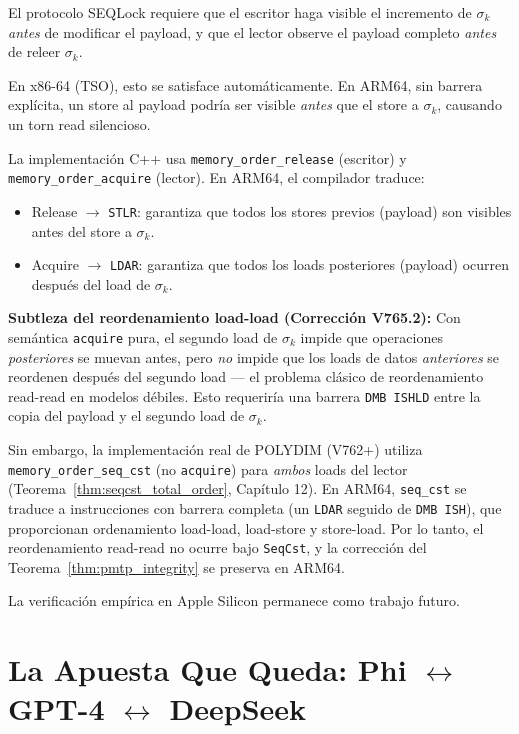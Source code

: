 \begin{remark}
\label{rem:arm_seqlock}
El protocolo SEQLock requiere que el escritor haga visible el incremento
de $\sigma_k$ \emph{antes} de modificar el payload, y que el lector
observe el payload completo \emph{antes} de releer $\sigma_k$.

En x86-64 (TSO), esto se satisface automáticamente. En ARM64, sin barrera
explícita, un store al payload podría ser visible \emph{antes} que el store
a $\sigma_k$, causando un torn read silencioso.

La implementación C++ usa \texttt{memory\_order\_release} (escritor) y
\texttt{memory\_order\_acquire} (lector). En ARM64, el compilador traduce:
\begin{itemize}
    \item Release $\to$ \texttt{STLR}: garantiza que todos los stores 
    previos (payload) son visibles antes del store a $\sigma_k$.
    \item Acquire $\to$ \texttt{LDAR}: garantiza que todos los loads 
    posteriores (payload) ocurren después del load de $\sigma_k$.
\end{itemize}

\textbf{Subtleza del reordenamiento load-load (Corrección V765.2):}
Con semántica \texttt{acquire} pura, el segundo load de $\sigma_k$ 
impide que operaciones \emph{posteriores} se muevan antes, pero 
\emph{no} impide que los loads de datos \emph{anteriores} se 
reordenen después del segundo load --- el problema clásico de 
reordenamiento read-read en modelos débiles. Esto requeriría una
barrera \texttt{DMB ISHLD} entre la copia del payload y el 
segundo load de $\sigma_k$.

Sin embargo, la implementación real de POLYDIM (V762+) utiliza
\texttt{memory\_order\_seq\_cst} (no \texttt{acquire}) para 
\emph{ambos} loads del lector 
(Teorema~\ref{thm:seqcst_total_order}, Capítulo 12). En ARM64,
\texttt{seq\_cst} se traduce a instrucciones con barrera completa 
(un \texttt{LDAR} seguido de \texttt{DMB ISH}), que proporcionan 
ordenamiento load-load, load-store y store-load. Por lo tanto, el 
reordenamiento read-read no ocurre bajo \texttt{SeqCst}, y la 
corrección del Teorema~\ref{thm:pmtp_integrity} se preserva en ARM64.

La verificación empírica en Apple Silicon permanece como trabajo futuro.
\end{remark}

\section{La Apuesta Que Queda: Phi $\leftrightarrow$ GPT-4 $\leftrightarrow$ DeepSeek}

